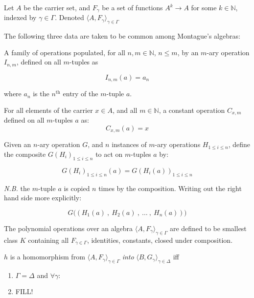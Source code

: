 \begin{defn}\label{algdata} 
Let $A$ be the carrier set, and $F_\gamma$ be a set of functions $A^k \rightarrow A$ for some $k \in \mathbb{N}$, indexed by $\gamma \in \Gamma$. Denoted $\langle A, F_\gamma \rangle_{\gamma \in \Gamma}$
\end{defn}

The following three data are taken to be common among Montague's algebras:

\begin{defn}[Identities]\label{ids} 
A family of operations populated, for all $n, m \in \mathbb{N}$, $n \leq m$, by an $m$-ary operation $I_{n,m}$, defined on all $m$-tuples as

$$I_{n,m}(a) = a_n$$

where $a_n$ is the $n^{\text{th}}$ entry of the $m$-tuple $a$.
\end{defn}


\begin{defn}[Constants]\label{constants}
For all elements of the carrier $x \in A$, and all $m \in \mathbb{N}$, a constant operation $C_{x,m}$ defined on all $m$-tuples $a$ as:
$$C_{x,m}(a) = x$$
\end{defn}

\begin{defn}[Composition]\label{comp}
Given an $n$-ary operation $G$, and $n$ instances of $m$-ary operations $H_{1 \leq i \leq n}$, define the composite $G(H_i)_{1 \leq i \leq n}$ to act on $m$-tuples $a$ by:

$$G(H_i)_{1 \leq i \leq n}(a) = G(H_i(a))_{1 \leq i \leq n}$$

\emph{N.B.} the $m$-tuple $a$ is copied $n$ times by the composition. Writing out the right hand side more explicitly:

$$G\bigg( \ \big( \ H_1(a) \ , \ H_2(a) \ , \ \ldots \ , \ H_n(a) \ \big) \  \bigg)$$
\end{defn}

\begin{defn}\label{polyop}
The polynomial operations over an algebra $\langle A, F_\gamma \rangle_{\gamma \in \Gamma}$ are defined to be smallest class $K$ containing all $F_{\gamma \in \Gamma}$, identities, constants, closed under composition.
\end{defn}

\begin{defn}\label{homo}
$h$ is a homomorphism from $\langle A, F_\gamma \rangle_{\gamma \in \Gamma}$ \emph{into} $\langle B, G_\gamma \rangle_{\gamma \in \Delta}$ iff
\begin{enumerate}
    \item{$\Gamma = \Delta$ and $\forall \gamma : $}
    \item{\bR FILL! \e}
\end{enumerate}
\end{defn}

